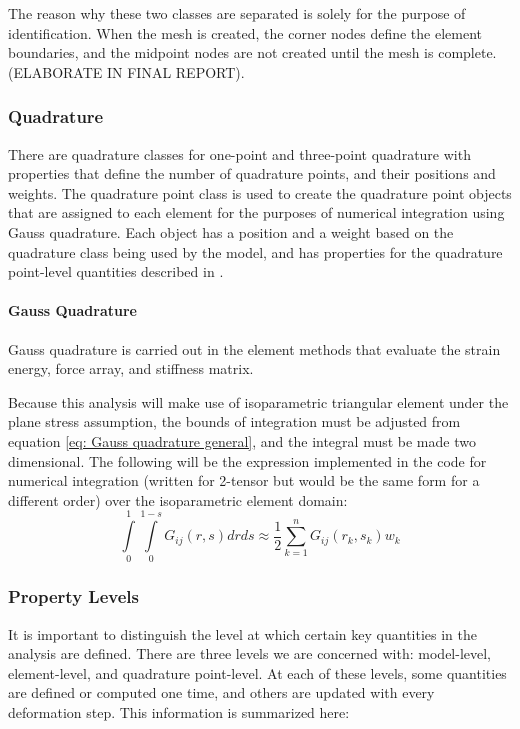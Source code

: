 \documentclass[]{spie}  %
\begin{document}
The reason why these two classes are separated is solely for the purpose of identification. When the mesh is created, the corner nodes define the element boundaries, and the midpoint nodes are not created until the mesh is complete. (ELABORATE IN FINAL REPORT). 

\subsubsection{Quadrature}
\label{sec: quadrature}
There are quadrature classes for one-point and three-point quadrature with properties that define the number of quadrature points, and their positions and weights. The quadrature point class is used to create the quadrature point objects that are assigned to each element for the purposes of numerical integration using Gauss quadrature. Each object has a position and a weight based on the quadrature class being used by the model, and has properties for the quadrature point-level quantities described in \textit{}. 

\paragraph{Gauss Quadrature}
Gauss quadrature is carried out in the element methods that evaluate the strain energy, force array, and stiffness matrix.

Because this analysis will make use of isoparametric triangular element under the plane stress assumption, the bounds of integration must be adjusted from equation \ref{eq: Gauss quadrature general}, and the integral must be made two dimensional. The following will be the expression implemented in the code for numerical integration (written for 2-tensor but would be the same form for a different order) over the isoparametric element domain:
\begin{equation}
\label{eq: Gauss quadrature}
\int\limits_{0}^{1} \int\limits_{0}^{1-s} G_{ij}(r,s)dr ds \approx \frac{1}{2} \sum\limits_{k=1}^{n} G_{ij}(r_k,s_k) w_k
\end{equation}

\subsubsection{Property Levels}
\label{sec: property levels}
It is important to distinguish the level at which certain key quantities in the analysis are defined. There are three levels we are concerned with: model-level, element-level, and quadrature point-level. At each of these levels, some quantities are defined or computed one time, and others are updated with every deformation step. This information is summarized here:
\end{document}
